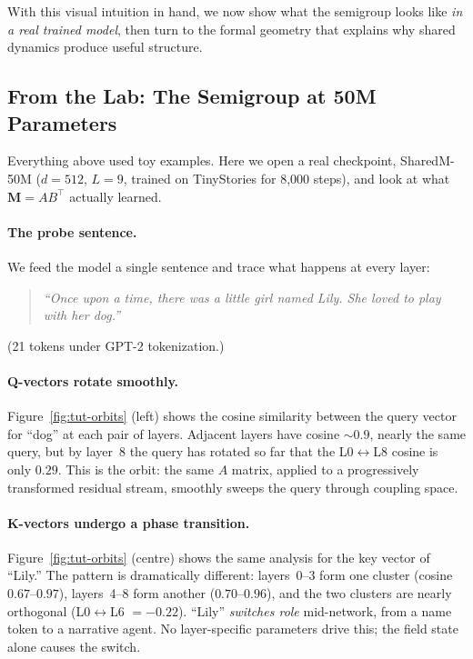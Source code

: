 \documentclass[11pt, a4paper]{article}
\newcommand{\M}{\mathbf{M}}
\theoremstyle{remark}
\begin{document}
\bigskip
\noindent
With this visual intuition in hand, we now show what the semigroup looks like \emph{in a real trained model}, then turn to the formal geometry that explains why shared dynamics produce useful structure.

\subsection{From the Lab: The Semigroup at 50M Parameters}
\label{sec:semigroup-lab}

Everything above used toy examples.
Here we open a real checkpoint, SharedM-50M ($d{=}512$, $L{=}9$, trained on TinyStories for 8{,}000 steps), and look at what $\M = AB^\top$ actually learned.

\paragraph{The probe sentence.}
We feed the model a single sentence and trace what happens at every layer:
\begin{quote}\itshape
``Once upon a time, there was a little girl named Lily. She loved to play with her dog.''
\end{quote}
(21 tokens under GPT-2 tokenization.)

\paragraph{Q-vectors rotate smoothly.}
Figure~\ref{fig:tut-orbits} (left) shows the cosine similarity between the query vector for ``dog'' at each pair of layers.
Adjacent layers have cosine ${\sim}0.9$, nearly the same query, but by layer~8 the query has rotated so far that the L0$\leftrightarrow$L8 cosine is only $0.29$.
This is the orbit: the same $A$ matrix, applied to a progressively transformed residual stream, smoothly sweeps the query through coupling space.

\paragraph{K-vectors undergo a phase transition.}
Figure~\ref{fig:tut-orbits} (centre) shows the same analysis for the key vector of ``Lily.''
The pattern is dramatically different: layers~0--3 form one cluster (cosine $0.67$--$0.97$), layers~4--8 form another ($0.70$--$0.96$), and the two clusters are nearly orthogonal (L0$\leftrightarrow$L6 $= -0.22$).
``Lily'' \emph{switches role} mid-network, from a name token to a narrative agent.
No layer-specific parameters drive this; the field state alone causes the switch.
\end{document}
